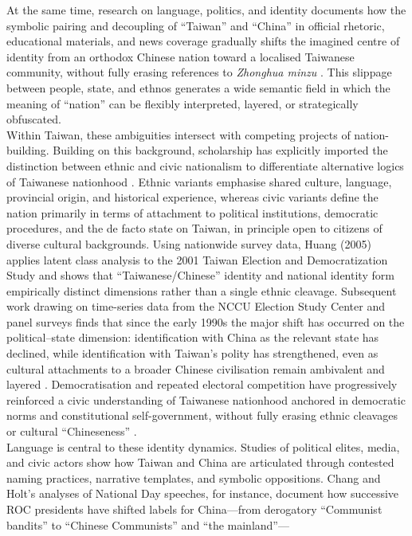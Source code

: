 \documentclass[man,12pt]{apa7}
\begin{document}
At the same time, research on language, politics, and identity documents how the symbolic pairing and decoupling of ``Taiwan'' and ``China'' in official rhetoric, educational materials, and news coverage 
gradually shifts the imagined centre of identity from an orthodox Chinese nation toward a localised Taiwanese community, without fully erasing references to \emph{Zhonghua minzu} \parencite{chang2014,huang2009,lai2018,wu2007}. 
This slippage between people, state, and ethnos generates a wide semantic field in which the meaning of ``nation'' can be flexibly interpreted, layered, or strategically obfuscated.\\%
Within Taiwan, these ambiguities intersect with competing projects of nation-building. 
Building on this background, scholarship has explicitly imported the distinction between ethnic and civic nationalism to differentiate alternative logics of Taiwanese nationhood \parencite{wu2007,wu2000,ngeow2010,lousche2022}. 
Ethnic variants emphasise shared culture, language, provincial origin, and historical experience, whereas civic variants define the nation primarily in terms of attachment to political institutions, democratic procedures, and the de facto state on Taiwan, 
in principle open to citizens of diverse cultural backgrounds. 
Using nationwide survey data, Huang (2005) applies latent class analysis to the 2001 Taiwan Election and Democratization Study and shows that ``Taiwanese/Chinese'' identity and national identity form empirically distinct dimensions rather than a single ethnic cleavage. 
Subsequent work drawing on time-series data from the NCCU Election Study Center and panel surveys finds that since the early 1990s the major shift has occurred on the political–state dimension: 
identification with China as the relevant state has declined, while identification with Taiwan's polity has strengthened, even as cultural attachments to a broader Chinese civilisation remain ambivalent and layered \parencite{shen2013,zhong2016}. 
Democratisation and repeated electoral competition have progressively reinforced a civic understanding of Taiwanese nationhood anchored in democratic norms and constitutional self-government, 
without fully erasing ethnic cleavages or cultural ``Chineseness'' \parencite{wang2005,chen2012,aleman2018,hur2020}.\\%
Language is central to these identity dynamics. 
Studies of political elites, media, and civic actors show how Taiwan and China are articulated through contested naming practices, narrative templates, and symbolic oppositions. 
Chang and Holt's analyses of National Day speeches, for instance, document how successive ROC presidents have shifted labels for China—from derogatory ``Communist bandits'' to ``Chinese Communists'' and ``the mainland''— 
\end{document}
